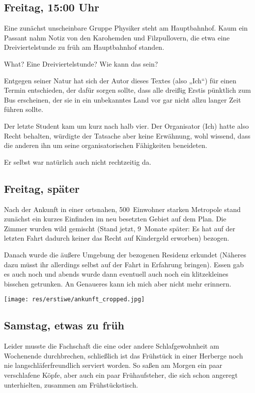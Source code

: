 \begin{multicols*}{2}
\subsection{Freitag, 15:00 Uhr}
Eine zunächst unscheinbare Gruppe Physiker steht am Hauptbahnhof.
Kaum ein Passant nahm Notiz von den Karohemden und Filzpullovern, die etwa eine Dreiviertelstunde zu früh am Hauptbahnhof standen.

What?
Eine Dreiviertelstunde?
Wie kann das sein?

Entgegen seiner Natur hat sich der Autor dieses Textes (also „Ich“) für einen Termin entschieden, der dafür sorgen sollte, dass alle dreißig Erstis pünktlich zum Bus erscheinen, der sie in ein unbekanntes Land vor gar nicht allzu langer Zeit führen sollte.

Der letzte Student kam um kurz nach halb vier.
Der Organisator (Ich) hatte also Recht behalten, würdigte der Tatsache aber keine Erwähnung, wohl wissend, dass die anderen ihn um seine organisatorischen Fähigkeiten beneideten.

Er selbst war natürlich auch nicht rechtzeitig da.

\subsection{Freitag, später}
Nach der Ankunft in einer ortsnahen, 500~Einwohner starken Metropole stand zunächst ein kurzes Einfinden im neu besetzten Gebiet auf dem Plan.
Die Zimmer wurden wild gemischt (Stand jetzt, 9~Monate später: Es hat auf der letzten Fahrt dadurch keiner das Recht auf Kindergeld erworben) bezogen.

Danach wurde die äußere Umgebung der bezogenen Residenz erkundet (Näheres dazu müsst ihr allerdings selbst auf der Fahrt in Erfahrung bringen).
Essen gab es auch noch und abends wurde dann eventuell auch noch ein klitzekleines bisschen getrunken.
An Genaueres kann ich mich aber nicht mehr erinnern.

\begin{center}
	\texttt{[image: res/erstiwe/ankunft\_cropped.jpg]}
\end{center}

\subsection{Samstag, etwas zu früh}
Leider musste die Fachschaft die eine oder andere Schlafgewohnheit am Wochenende durchbrechen, schließlich ist das Frühstück in einer Herberge noch nie langschläferfreundlich serviert worden.
So saßen am Morgen ein paar verschlafene Köpfe, aber auch ein paar Frühaufsteher, die sich schon angeregt unterhielten, zusammen am Frühstückstisch.


\end{multicols*}
